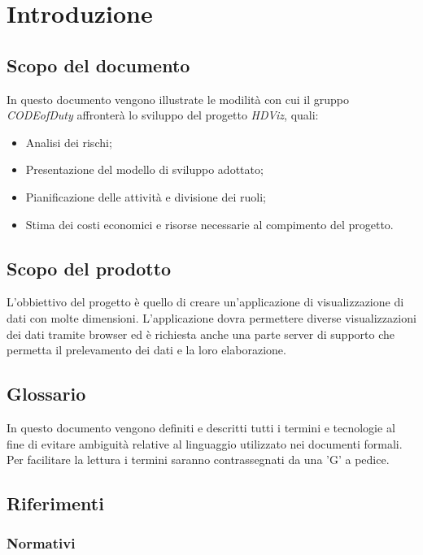 \section{Introduzione}
\subsection{Scopo del documento}
	In questo documento vengono illustrate le modilità con cui il gruppo \emph{CODEofDuty} affronterà lo sviluppo del progetto \emph{HDViz}, quali:
	\begin{itemize}
    		\item Analisi dei rischi;
    		\item Presentazione del modello di sviluppo adottato;
    		\item Pianificazione delle attività e divisione dei ruoli;
    		\item Stima dei costi economici e risorse necessarie al compimento del progetto.
	\end{itemize}
\subsection{Scopo del prodotto}
	L'obbiettivo del progetto è quello di creare un'applicazione di visualizzazione di dati con molte dimensioni. L'applicazione dovra permettere diverse visualizzazioni dei dati tramite browser ed è richiesta anche una parte server di supporto che permetta il prelevamento dei dati e la loro elaborazione.
\subsection{Glossario}
	In questo documento vengono definiti e descritti tutti i termini e tecnologie al fine di evitare ambiguità relative al linguaggio utilizzato nei documenti formali. Per facilitare la lettura i termini saranno contrassegnati da una 'G' a pedice.  
\subsection{Riferimenti}
	\subsubsection{Normativi}
